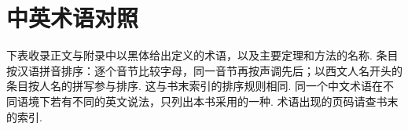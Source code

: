 
\chapter{中英术语对照}\label{app:glossary}

下表收录正文与附录中以黑体给出定义的术语，以及主要定理和方法的名称. 条目按汉语拼音排序：逐个音节比较字母，同一音节再按声调先后；以西文人名开头的条目按人名的拼写参与排序. 这与书末索引的排序规则相同. 同一个中文术语在不同语境下若有不同的英文说法，只列出本书采用的一种. 术语出现的页码请查书末的索引.

